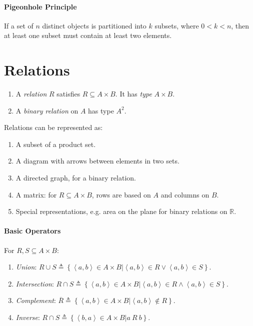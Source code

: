\documentclass[10pt,twoside,twocolumn]{article}
\newcommand{\R}[0]{\mathds{R}} %
\begin{document}
\paragraph{Pigeonhole Principle}

If a set of $n$ distinct objects is partitioned into $k$ subsets,
where $0<k<n$, then at least one subset must contain at least two
elements.


\section{Relations}
\begin{enumerate}
\item A \emph{relation} $R$ satisfies $R\subseteq A\times B$. It has \emph{type}
$A\times B$. 
\item A \emph{binary relation} on $A$ has type $A^{2}$. 
\end{enumerate}
Relations can be represented as: 
\begin{enumerate}
\item A subset of a product set. 
\item A diagram with arrows between elements in two sets. 
\item A directed graph, for a binary relation. 
\item A matrix: for $R\subseteq A\times B$, rows are based on $A$ and
columns on $B$. 
\item Special representations, e.g. area on the plane for binary relations
on $\R$. 
\end{enumerate}

\paragraph{Basic Operators}

For $R,S\subseteq A\times B$: 
\begin{enumerate}
\item \emph{Union}: $R\cup S\triangleq\left\{ \left\langle a,b\right\rangle \in A\times B|\left\langle a,b\right\rangle \in R\lor\left\langle a,b\right\rangle \in S\right\} $. 
\item \emph{Intersection}: $R\cap S\triangleq\left\{ \left\langle a,b\right\rangle \in A\times B|\left\langle a,b\right\rangle \in R\land\left\langle a,b\right\rangle \in S\right\} $. 
\item \emph{Complement}: $\overline{R}\triangleq\left\{ \left\langle a,b\right\rangle \in A\times B|\left\langle a,b\right\rangle \not\in R\right\} $. 
\item \emph{Inverse}: $R\cap S\triangleq\left\{ \left\langle b,a\right\rangle \in A\times B|a\:R\:b\right\} $. 
\end{enumerate}
\end{document}

